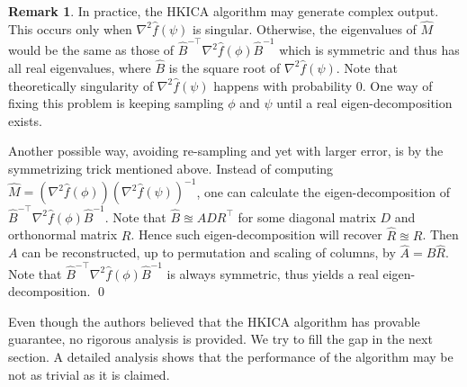 \documentclass[twoside]{article}
\theoremstyle{definition}
\newtheorem{remark}[lemma]{Remark}
\begin{document}
\begin{remark}
\label{rmk:symmetrization}
In practice, the HKICA algorithm may generate complex output. 
This occurs only when $\nabla^2\widehat{f}(\psi)$ is singular. 
Otherwise, the eigenvalues of $\widehat{M}$ would be the same as those of
$\widehat{B}^{-\top}\nabla^2 \widehat{f}(\phi)\widehat{B}^{-1}$ which is symmetric and thus has all real eigenvalues, where $\widehat{B} $ is the square root of $\nabla^2\widehat{f}(\psi)$. 
Note that theoretically singularity of $\nabla^2\widehat{f}(\psi)$ happens with probability 0. 
One way of fixing this problem is keeping sampling $\phi$ and $\psi$ until a real eigen-decomposition exists.

Another possible way, avoiding re-sampling and yet with larger error, is by the symmetrizing trick mentioned above.
Instead of computing $\widehat{M} = (\nabla^2 \widehat{f}(\phi))(\nabla^2\widehat{f}(\psi))^{-1}$, one can calculate the eigen-decomposition of  $\widehat{B}^{-\top}\nabla^2 \widehat{f}(\phi)\widehat{B}^{-1}$. 
Note that $\widehat{B} \approxeq ADR^{\top}$ for some diagonal matrix $D$ and orthonormal matrix $R$. 
Hence such eigen-decomposition will recover $\widehat{R}\approxeq R$. 
Then $A$ can be reconstructed, up to permutation and scaling of columns, by $\widehat{A} = \widehat{B}\widehat{R}$.
Note that $ \widehat{B}^{-\top}\nabla^2 \widehat{f}(\phi)\widehat{B}^{-1}$ is always symmetric, thus yields a real eigen-decomposition. \qed
\end{remark}

Even though the authors believed that the HKICA algorithm has provable guarantee, no rigorous analysis is provided. 
We try to fill the gap in the next section. 
A detailed analysis shows that the performance of the algorithm may be not as trivial as it is claimed.
\end{document}
